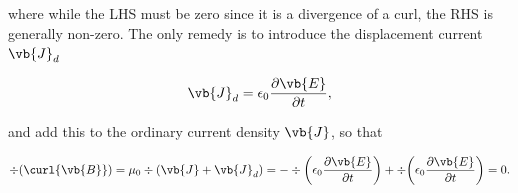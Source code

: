 \documentclass[english,a4paper,12pt]{report}
\begin{document}
where while the LHS must be zero since it is a divergence of a curl, the RHS is generally non-zero. The only remedy is to introduce the displacement current \(\vb{J} _{d} \)

\begin{equation}
    \vb{J} _{d} = \epsilon_0 \frac{\partial \vb{E} }{\partial t}, 
\end{equation}

and add this to the ordinary current density \(\vb{J} \), so that 

\begin{equation}
    \div{(\curl{\vb{B} } )} = \mu_0 \div{(\vb{J} + \vb{J} _{d} )} = -\div{\left( \epsilon_0 \frac{\partial \vb{E} }{\partial t}  \right)} + \div{\left( \epsilon_0 \frac{\partial \vb{E} }{\partial t}  \right)} = 0. 
\end{equation}
\end{document}
